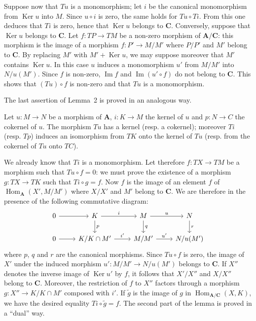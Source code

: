 Suppose now that $Tu$ is a monomorphism; let $i$ be the canonical
monomorphism from $\operatorname{Ker}u$ into $M$. Since $u\circ i$ is
zero, the same holds for $Tu\circ Ti$. From this one deduces that $Ti$ is
zero, hence that $\operatorname{Ker}u$ belongs to $\mathbf C$.
Conversely, suppose that $\operatorname{Ker}u$ belongs to $\mathbf C$.
Let $f:TP\to TM$ be a non-zero morphism of
$\mathbf A/\mathbf C$: this morphism is the image of a morphism
$f:P'\to M/M'$ where $P/P'$ and $M'$ belong to $\mathbf C$. By replacing
$M'$ with $M'+\operatorname{Ker}u$, we may suppose moreover that $M'$
contains $\operatorname{Ker}u$. In this case $u$ induces a
monomorphism $u'$ from $M/M'$ into $N/u(M')$. Since $f$ is non-zero,
$\operatorname{Im}f$ and $\operatorname{Im}(u'\circ f)$ do not belong
to $\mathbf C$. This shows that $(Tu)\circ f$ is non-zero and that $Tu$ is
a monomorphism.

The last assertion of Lemma~2 is proved in an analogous way.

\begin{lemma}
Let $u:M\to N$ be a morphism of $\mathbf A$, $i:K\to M$ the kernel
of $u$ and $p:N\to C$ the cokernel of $u$. The morphism $Tu$ has a
kernel (resp. a cokernel); moreover $Ti$ (resp. $Tp$) induces an
isomorphism from $TK$ onto the kernel of $Tu$ (resp. from the cokernel
of $Tu$ onto $TC$).
\end{lemma}

We already know that $Ti$ is a monomorphism. Let therefore
$f:TX\to TM$ be a morphism such that $Tu\circ f=0$: we must prove the
existence of a morphism $g:TX\to TK$ such that $Ti\circ g=f$. Now $f$
is the image of an element $f$ of
$\operatorname{Hom}_{\mathbf A}(X',M/M')$ where $X/X'$ and $M'$ belong
to $\mathbf C$. We are therefore in the presence of the following
commutative diagram:
\[
\begin{tikzcd}
0 \arrow[r] & K \arrow[r, "i"] \arrow[d, "p"] & M \arrow[r, "u"] \arrow[d, "q"] & N \arrow[d, "r"] \\
0 \arrow[r] & K/K\cap M' \arrow[r, "i^{\prime}"] & M/M' \arrow[r, "u^{\prime}"] & N/u(M')
\end{tikzcd}
\]
where $p$, $q$ and $r$ are the canonical morphisms. Since
$Tu\circ f$ is zero, the image of $X'$ under the induced morphism
$u':M/M'\to N/u(M')$ belongs to $\mathbf C$. If $X''$ denotes the
inverse image of $\operatorname{Ker}u'$ by $f$, it follows that
$X'/X''$ and $X/X''$ belong to $\mathbf C$. Moreover, the restriction of
$f$ to $X''$ factors through a morphism
$g:X''\to K/K\cap M'$ composed with $i'$. If $\tilde g$ is the image
of $g$ in $\operatorname{Hom}_{\mathbf A/\mathbf C}(X,K)$, we have the
desired equality $Ti\circ\tilde g=f$. The second part of the lemma is
proved in a ``dual'' way.

